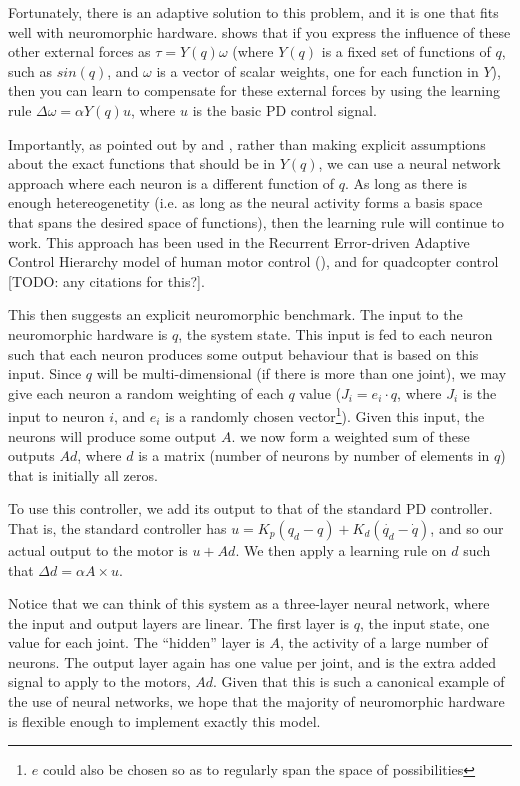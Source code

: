 \documentclass{frontiersSCNS} %
\begin{document}
Fortunately, there is an adaptive solution to this problem, and it is one that
fits well with neuromorphic hardware.  \cite{Slotine1987} shows that if you
express the influence of these other external forces as $\tau=Y(q) \omega$
(where $Y(q)$ is a fixed set of functions of $q$, such as $sin(q)$, and $\omega$
is a vector of scalar weights, one for each function in $Y$), then you can learn
to compensate for these external forces by using the learning rule $\Delta \omega = \alpha Y(q) u$,
where $u$ is the basic PD control signal.

Importantly, as pointed out by \cite{SannerSlotine1992} and \cite{Lewis1996}, rather than making explicit
assumptions about the exact functions that should be in $Y(q)$, we can use
a neural network approach where each neuron is a different function of $q$.  
As long as there is enough hetereogenetity (i.e. as long as the neural activity
forms a basis space that spans the desired space of functions), then the
learning rule will continue to work.  This approach has been used in the
Recurrent Error-driven Adaptive Control Hierarchy model of human motor control
(\citealt{dewolf2014}), and for quadcopter control [TODO: any citations for this?].

This then suggests an explicit neuromorphic benchmark.  The input to the
neuromorphic hardware is $q$, the system state.  This input is fed to each
neuron such that each neuron produces some output behaviour that is based on
this input.  Since $q$ will be multi-dimensional (if there is more than one
joint), we may give each neuron a random weighting of each $q$ value ($J_i=e_i \cdot q$, 
where $J_i$ is the input to neuron $i$, and $e_i$ is a randomly chosen vector\footnote{$e$ could also be chosen so as to regularly span the space of possibilities}).  Given this input, the neurons will produce some output $A$.
we now form a weighted sum of these outputs $Ad$, where $d$ is a matrix (number of neurons by number of elements in $q$)
that is initially all zeros.

To use this controller, we add its output to that of the standard PD controller.
That is, the standard controller has $u=K_p(q_d - q) + K_d(\dot{q_d} - \dot{q})$,
and so our actual output to the motor is $u + Ad$.  We then apply a learning
rule on $d$ such that $\Delta d = \alpha A \times u$.

Notice that we can think of this system as a three-layer neural
network, where the input and output layers are linear.  The first layer is $q$, the input state, one value for each joint.  The ``hidden'' layer
is $A$, the activity of a large number of neurons.  The output layer again has
one value per joint, and is the extra added signal to apply to the motors, $Ad$.
Given that this is such a canonical example of the use of neural networks, we
hope that the majority of neuromorphic hardware is flexible enough to implement
exactly this model.
\end{document}
